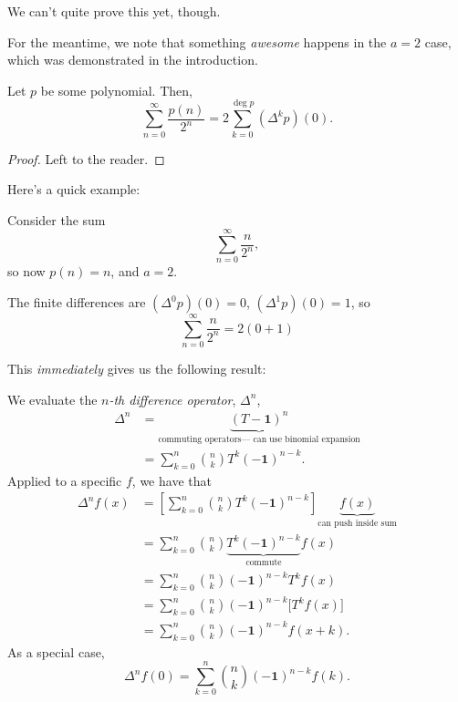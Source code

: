 \documentclass{article}
\DeclareMathOperator{\degree}{deg}
\begin{document}
We can't quite prove this yet, though.

For the meantime, we note that something \textit{awesome} happens in the $a=2$ case, which was demonstrated in the introduction.

\begin{corollary}
    Let $p$ be some polynomial.
    Then,
    \[
        \sum_{n=0}^\infty \frac{p(n)}{2^n} = 2\sum_{k=0}^{\degree p} (\Delta^k p)(0).
    \]
\end{corollary}

\begin{proof}
    Left to the reader.
\end{proof}

Here's a quick example:

\begin{example}
    Consider the sum
    \[
        \sum_{n=0}^\infty \frac{n}{2^n},
    \]
    so now $p(n) = n$, and $a = 2$.

    The finite differences are $(\Delta^0 p)(0) = 0$, $(\Delta^1 p)(0) = 1$, so
    \[
        \sum_{n=0}^\infty \frac{n}{2^n} = 2(0 + 1)
    \]
\end{example}


\iffalse
This \textit{immediately} gives us the following result:

\begin{computation}
    We evaluate the \textit{$n$-th difference operator}, $\Delta^n$,
    \begin{align*}
        \Delta^n &= \underbrace{(T-\mathbf{1})^n}_{\text{commuting operators--- can use binomial expansion}} \\
                 &= \sum_{k=0}^n \binom{n}{k} T^k(-\mathbf{1})^{n-k}.
    \end{align*}
    Applied to a specific $f$, we have that
    \begin{align*}
        \Delta^n f(x) &= \left[\sum_{k=0}^n \binom{n}{k} T^k(-\mathbf{1})^{n-k}\right] \underbrace{f(x)}_\text{can push inside sum} \\
                      &= \sum_{k=0}^n \binom{n}{k} \underbrace{T^k(-\mathbf{1})^{n-k}}_{\text{commute}}f(x) \\
                      &= \sum_{k=0}^n \binom{n}{k}(-\mathbf{1})^{n-k}T^kf(x) \\
                      &= \sum_{k=0}^n \binom{n}{k}(-\mathbf{1})^{n-k}\Big[T^kf(x)\Big] \\
                      &= \sum_{k=0}^n \binom{n}{k}(-\mathbf{1})^{n-k}f(x+k).
    \end{align*}
    As a special case,
    \[
        \Delta^n f(0) = \sum_{k=0}^n \binom{n}{k}(-\mathbf{1})^{n-k}f(k).
    \]
\end{computation}
\end{document}
